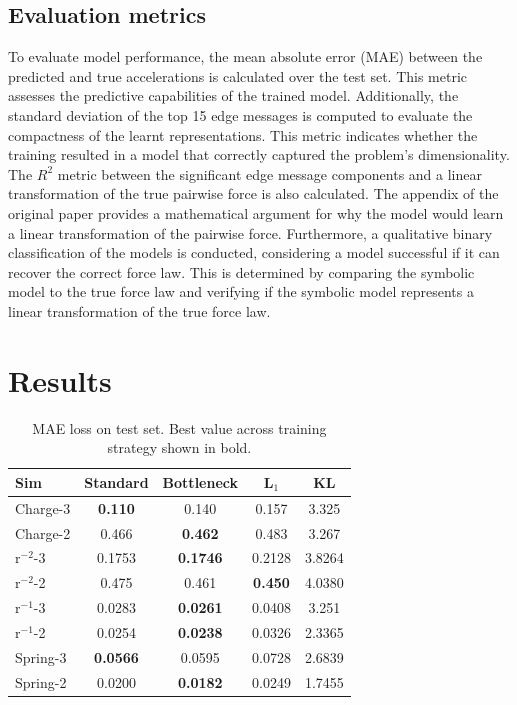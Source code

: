 \documentclass[11pt]{article}
\begin{document}
\subsection{Evaluation metrics}
To evaluate model performance, the mean absolute error (MAE) between the predicted and true accelerations is calculated over the test set. This metric assesses the predictive capabilities of the trained model. Additionally, the standard deviation of the top 15 edge messages is computed to evaluate the compactness of the learnt representations. This metric indicates whether the training resulted in a model that correctly captured the problem's dimensionality. The $R^2$ metric between the significant edge message components and a linear transformation of the true pairwise force is also calculated. The appendix of the original paper provides a mathematical argument for why the model would learn a linear transformation of the pairwise force. Furthermore, a qualitative binary classification of the models is conducted, considering a model successful if it can recover the correct force law. This is determined by comparing the symbolic model to the true force law and verifying if the symbolic model represents a linear transformation of the true force law.


\section{Results}
    \begin{table}[H]
        \centering
        \begin{tabular}{lcccc}
        \hline
        Sim & Standard & Bottleneck & L$_1$ & KL \\
        \hline
        Charge-3 & \textbf{0.110}  & 0.140  & 0.157  & 3.325  \\
        Charge-2 & 0.466  & \textbf{0.462}  & 0.483  & 3.267  \\
        r$^{-2}$-3 & 0.1753  & \textbf{0.1746}  & 0.2128  & 3.8264  \\
        r$^{-2}$-2 & 0.475  & 0.461  & \textbf{0.450}  & 4.0380  \\
        r$^{-1}$-3 & 0.0283  & \textbf{0.0261}  & 0.0408  & 3.251  \\
        r$^{-1}$-2 & 0.0254  & \textbf{0.0238}  & 0.0326  & 2.3365  \\
        Spring-3 & \textbf{0.0566}  & 0.0595  & 0.0728  & 2.6839  \\
        Spring-2 & 0.0200  & \textbf{0.0182}  & 0.0249  & 1.7455  \\
        \hline
        \end{tabular}
        \caption{MAE loss on test set. Best value across training strategy shown in bold.}
        \label{tab:reordered_table}
    \end{table}
\end{document}
